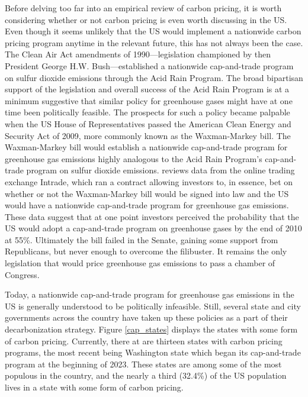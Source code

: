 Before delving too far into an empirical review of carbon pricing, it is worth considering whether or not carbon pricing is even worth discussing in the US. Even though it seems unlikely that the US would implement a nationwide carbon pricing program anytime in the relevant future, this has not always been the case. The Clean Air Act amendments of 1990---legislation championed by then President George H.W. Bush---established a nationwide cap-and-trade program on sulfur dioxide emissions through the Acid Rain Program. The broad bipartisan support of the legislation and overall success of the Acid Rain Program is at a minimum suggestive that similar policy for greenhouse gases might have at one time been politically feasible. The prospects for such a policy became palpable when the US House of Representatives passed the American Clean Energy and Security Act of 2009, more commonly known as the Waxman-Markey bill. The Waxman-Markey bill would establish a nationwide cap-and-trade program for greenhouse gas emissions highly analogous to the Acid Rain Program's cap-and-trade program on sulfur dioxide emissions. \cite{meng2017using} reviews data from the online trading exchange Intrade, which ran a contract allowing investors to, in essence,  bet on whether or not the Waxman-Markey bill would be signed into law and the US would have a nationwide cap-and-trade program for greenhouse gas emissions. These data suggest that at one point investors perceived the probability that the US would adopt a cap-and-trade program on greenhouse gases by the end of 2010 at 55\%. Ultimately the bill failed in the Senate, gaining some support from Republicans, but never enough to overcome the filibuster. It remains the only legislation that would price greenhouse gas emissions to pass a chamber of Congress. 

Today, a nationwide cap-and-trade program for greenhouse gas emissions in the US is generally understood to be politically infeasible. Still, several state and city governments across the country have taken up these policies as a part of their decarbonization strategy. Figure \ref{cap_states} displays the states with some form of carbon pricing. Currently, there at are thirteen states with carbon pricing programs, the most recent being Washington state which began its cap-and-trade program at the beginning of 2023. These states are among some of the most populous in the country, and the nearly a third (32.4\%) of the US population lives in a state with some form of carbon pricing. 

